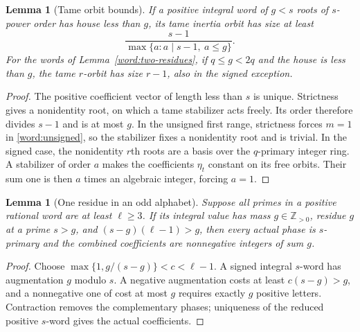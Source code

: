 \documentclass[11pt,a4paper]{article}
\numberwithin{equation}{section}
\newtheorem{lemma}[theorem]{Lemma}
\begin{document}
\begin{lemma}[Tame orbit bounds]\label{word:tame-orbit}
If a positive integral word of $g<s$ roots of $s$-power order
has house less than $g$, its tame inertia orbit has size at least
\[
 \frac{s-1}{\max\{a:a\mid s-1,\ a\le g\}}.
\]
\label{word:first-range}
For the words of Lemma~\ref{word:two-residues}, if $q\le g<2q$
and the house is less than $g$, the tame $r$-orbit has size $r-1$,
also in the signed exception.
\end{lemma}
\begin{proof}
The positive coefficient vector of length less than $s$ is unique.
Strictness gives a nonidentity root, on which a tame stabilizer
acts freely. Its order therefore divides $s-1$ and is at most $g$.
In the unsigned first range, strictness forces $m=1$ in
\eqref{word:unsigned}, so the stabilizer fixes a nonidentity root
and is trivial. In the signed case, the nonidentity $r$th roots
are a basis over the $q$-primary integer ring. A stabilizer of
order $a$ makes the coefficients $\eta_t$ constant on its free
orbits. Their sum one is then $a$ times an algebraic integer,
forcing $a=1$.
\end{proof}

\begin{lemma}[One residue in an odd alphabet]\label{word:one-residue}
Suppose all primes in a positive rational word are at least
$\ell\ge3$. If its integral value has mass $g\in\mathbb Z_{>0}$,
residue $g$ at a prime $s>g$, and
$(s-g)(\ell-1)>g$, then every actual phase is $s$-primary and
the combined coefficients are nonnegative integers of sum $g$.
\end{lemma}
\begin{proof}
Choose $\max\{1,g/(s-g)\}<c<\ell-1$. A signed integral
$s$-word has augmentation $g$ modulo $s$. A negative augmentation
costs at least $c(s-g)>g$, and a nonnegative one of cost at most
$g$ requires exactly $g$ positive letters. Contraction removes
the complementary phases; uniqueness of the reduced positive
$s$-word gives the actual coefficients.
\end{proof}
\end{document}
